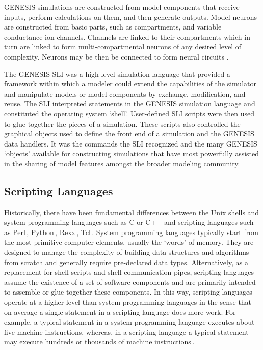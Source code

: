 \documentclass[10pt]{article}
\begin{document}
GENESIS simulations are constructed from model components that receive
inputs, perform calculations on them, and then generate outputs. Model
neurons are constructed from basic parts, such as compartments, and
variable conductance ion channels. Channels are linked to their
compartments which in turn are linked to form
multi-compartmental neurons of any desired level of complexity.
Neurons may be then be connected to form neural circuits \cite{bower98:_book_genes}. 

The GENESIS SLI was a high-level simulation language that provided a
framework within which a modeler could extend the capabilities of the
simulator and manipulate models or model components by exchange,
modification, and reuse. The SLI interpreted statements in the GENESIS
simulation language and constituted the operating system `shell'.
User-defined SLI scripts were then used to glue together the pieces of
a simulation. These scripts also controlled the graphical objects used
to define the front end of a simulation and the GENESIS data handlers.
It was the commands the SLI recognized and the many GENESIS `objects'
available for constructing simulations that have most powerfully
assisted in the sharing of model features amongst the broader modeling
community.

\subsection*{Scripting Languages}

Historically, there have been fundamental differences between the Unix
shells and system programming languages such as C or C++ and scripting
languages such as Perl\,\cite{wall99:_perl_progr_refer_guide},
Python\,\cite{martelli06:_python_nutsh},
Rexx\,\cite{ohara88:_moder_progr_using_rexx},
Tcl\,\cite{ousterhout94:_tcl_tk_toolk}.  System
programming languages typically start from the most primitive computer
elements, usually the `words' of memory. They are designed to manage
the complexity of building data structures and algorithms from scratch
and generally require pre-declared data types.  Alternatively, as a
replacement for shell scripts and shell communication pipes, scripting
languages assume the existence of a set of software components and are
primarily intended to assemble or glue together these components.
In this way, scripting languages operate at a higher level than system
programming languages in the sense that on average a single statement
in a scripting language does more work.  For example, a typical statement in a system
programming language executes about five machine instructions, whereas,
in a scripting language a typical statement may execute hundreds or thousands of machine instructions\,\cite{ousterhout98:_scrip}.
\end{document}

